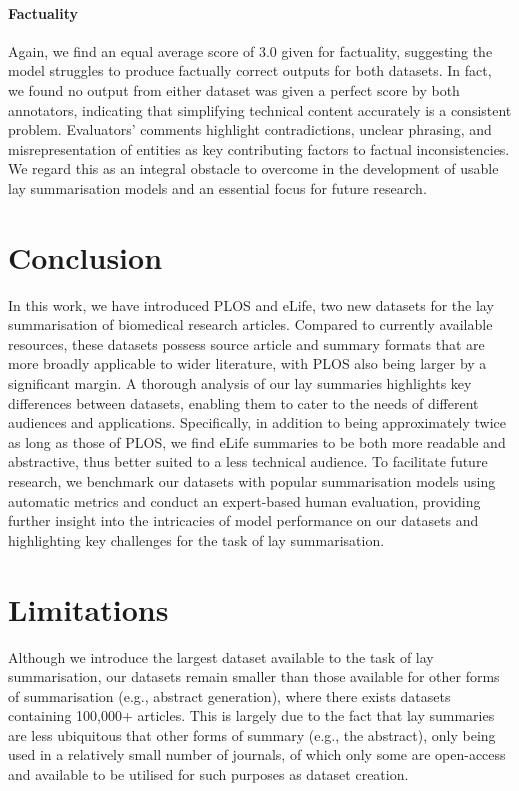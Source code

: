 \documentclass[11pt]{article}
\begin{document}
\paragraph{Factuality}

Again, we find an equal average score of 3.0 given for factuality, suggesting the model struggles to produce factually correct outputs for both datasets. In fact, we found no output from either dataset was given a perfect score by both annotators, indicating that simplifying technical content accurately is a consistent problem. Evaluators' comments highlight contradictions, unclear phrasing, and misrepresentation of entities as key contributing factors to factual inconsistencies. We regard this as an integral obstacle to overcome in the development of usable lay summarisation models and an essential focus for future research.












 \section{Conclusion} \label{sec:conclusion}
In this work, we have introduced PLOS and eLife, two new datasets for the lay summarisation of biomedical research articles. 
Compared to currently available resources, these datasets possess source article and summary formats that are more broadly applicable to wider literature, with PLOS also being larger by a significant margin.    
A thorough analysis of our lay summaries highlights key differences  between datasets, enabling them to cater to the needs of different audiences and applications. Specifically, in addition to being approximately twice as long as those of PLOS, we find eLife summaries to be both more readable and abstractive, thus better suited to a less technical audience.
To facilitate future research, we benchmark our datasets with popular summarisation models using automatic metrics and conduct an expert-based human evaluation, providing further insight into the intricacies of model performance on our datasets and highlighting key challenges for the task of lay summarisation.

%
 \section{Limitations}
\label{sec:limitations}
Although we introduce the largest dataset available to the task of lay summarisation, our datasets remain smaller than those available for other forms of summarisation (e.g., abstract generation), where there exists datasets containing 100,000+ articles. This is largely due to the fact that lay summaries are less ubiquitous that other forms of summary (e.g., the abstract), only being used in a relatively small number of journals, of which only some are open-access and available to be utilised for such purposes as dataset creation. 
\end{document}
